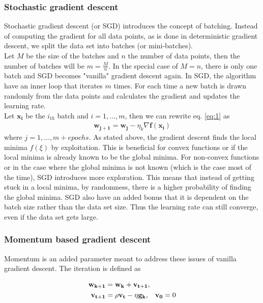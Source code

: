 \documentclass{article}
\theoremstyle{definition}
\begin{document}
\subsubsection{Stochastic gradient descent}
Stochastic gradient descent (or SGD) introduces the concept of batching. Instead of computing the gradient for all data points, as is done in deterministic gradient descent, we split the data set into batches (or mini-batches). \\
Let $M$ be the size of the batches and $n$ the number of data points, then the number of batches will be $m = \frac{M}{n}$. In the special case of $M = n$, there is only one batch and SGD becomes "vanilla" gradient descent again. In SGD, the algorithm have an inner loop that iterates $m$ times. For each time a new batch is drawn randomly from the data points and calculates the gradient and updates the learning rate. \\
Let $\mathbf{x_i}$ be the $i_{th}$ batch and $i=1,...,m$, then we can rewrite eq. \autoref{eq:1} as
\begin{align*}
        \mathbf{w_{j+1}} = \mathbf{w_j} - \eta_k\nabla\mathbf{f(x_i)}
\end{align*}
where $j=1,...,m+epochs$. As stated above, the gradient descent finds the local minima $f(\xi)$ by exploitation. This is beneficial for convex functions or if the local minima is already known to be the global minima. For non-convex functions or in the case where the global minima is not known (which is the case most of the time), SGD introduces more exploration. This means that instead of getting stuck in a local minima, by randomness, there is a higher probability of finding the global minima. SGD also have an added bonus that it is dependent on the batch size rather than the data set size. Thus the learning rate can still converge, even if the data set gets large.

\subsubsection{Momentum based gradient descent}
Momentum is an added parameter meant to address these issues of vanilla gradient descent. The iteration is defined as

\begin{align*}
    \mathbf{w_{k+1}} &= \mathbf{w_k} + \mathbf{v_{t+1}}, \\
    \mathbf{v_{t+1}} &= \rho \mathbf{v_t} - \eta \mathbf{g_k}, \hspace{3mm} \mathbf{v_0} = 0
\end{align*}
\end{document}
